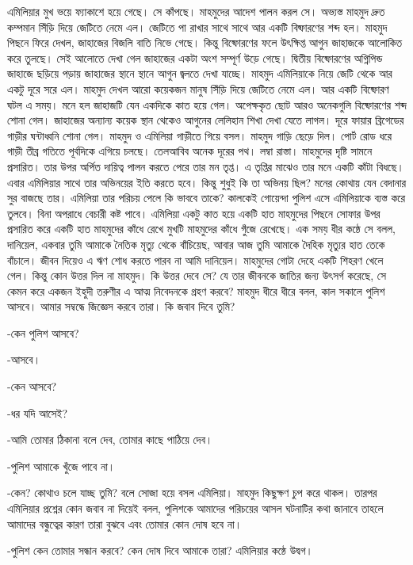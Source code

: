 \documentclass[
]{book}
\begin{document}
এমিলিয়ার মুখ ভয়ে ফ্যাকাশে হয়ে গেছে। সে কাঁপছে। মাহমুদের আদেশ পালন করল সে। অভ্যস্ত মাহমুদ দ্রুত কম্পমান সিঁড়ি দিয়ে জেটিতে নেমে এল। জেটিতে পা রাখার সাথে সাথে আর একটি বিষ্ফারণের শব্দ হল। মাহমুদ পিছনে ফিরে দেখল, জাহাজের বিজলি বাতি নিভে গেছে। কিন্তু বিষ্ফোরণের ফলে উৎক্ষিপ্ত আগুন জাহাজকে আলোকিত করে তুলছে। সেই আলোতে দেখা গেল জাহাজের একটা অংশ সম্পূর্ণ উড়ে গেছে। দ্বিতীয় বিষ্ফোরণের অগ্নিপিন্ড জাহাজে ছড়িয়ে পড়ায় জাহাজের স্থানে স্থানে আগুন জ্বলতে দেখা যাচ্ছে। মাহমুদ এমিলিয়াকে নিয়ে জেটি থেকে আর একটু দূরে সরে এল। মাহমুদ দেখল আরো কয়েকজন মানুষ সিঁড়ি দিয়ে জেটিতে নেমে এল। আর একটি বিষ্ফোরণ ঘটল এ সময়। মনে হল জাহাজটি যেন একদিকে কাত হয়ে গেল। অপেক্ষকৃত ছোট আরও অনেকগুলি বিষ্ফোরণের শব্দ শোনা গেল। জাহাজের অন্যান্য কয়েক স্থান থেকেও আগুনের লেলিহান শিখা দেখা যেতে লাগল। দূরে ফায়ার ব্রিগেডের গাড়ীর ঘন্টাধ্বনি শোনা গেল। মাহমুদ ও এমিলিয়া গাড়ীতে গিয়ে বসল। মাহমুদ গাড়ি ছেড়ে দিল। পোর্ট রোড ধরে গাড়ী তীব্র গতিতে পূর্বদিকে এগিয়ে চলছে। তেলআবিব অনেক দূরের পথ। লম্বা রাস্তা। মাহমুদের দৃষ্টি সামনে প্রসারিত। তার উপর অর্পিত দায়িত্ব পালন করতে পেরে তার মন তৃপ্ত। এ তৃপ্তির মাঝেও তার মনে একটি কাঁটা বিধছে। এবার এমিলিয়ার সাথে তার অভিনয়ের ইতি করতে হবে। কিন্তু শুধুই কি তা অভিনয় ছিল? মনের কোথায় যেন বেদানার সুর বাজছে তার। এমিলিয়া তার পরিচয় পেলে কি ভাববে তাকে? কালকেই গোয়েন্দা পুলিশ এসে এমিলিয়াকে ব্যস্ত করে তুলবে। বিনা অপরাধে বেচারী কষ্ট পাবে। এমিলিয়া একটু কাত হয়ে একটি হাত মাহমুদের পিছনে সোফার উপর প্রসারিত করে একটি হাত মাহমুদের কাঁধে রেখে মুখটি মাহমুদের কাঁধে গুঁজে রেখেছে। এক সময় ধীর কন্ঠে সে বলল, দানিয়েল, একবার তুমি আমাকে নৈতিক মৃত্যু থেকে বাঁচিয়েছ, আবার আজ তুমি আমাকে দৈহিক মৃত্যুর হাত তেকে বাঁচালে। জীবন দিয়েও এ ঋণ শোধ করতে পারব না আমি দানিয়েল। মাহমুদের গোটা দেহে একটি শিহরণ খেলে গেল। কিন্তু কোন উত্তর দিল না মাহমুদ। কি উত্তর দেবে সে? যে তার জীবনকে জাতির জন্য উৎসর্গ করেছে, সে কেমন করে একজন ইহুদী তরুণীর এ আত্ম নিবেদনকে গ্রহণ করবে? মাহমুদ ধীরে ধীরে বলল, কাল সকালে পুলিশ আসবে। আমার সম্বন্ধে জিজ্ঞেস করবে তারা। কি জবাব দিবে তুমি?

-কেন পুলিশ আসবে?

-আসবে।

-কেন আসবে?

-ধর যদি আসেই?

-আমি তোমার ঠিকানা বলে দেব, তোমার কাছে পাঠিয়ে দেব।

-পুলিশ আমাকে খুঁজে পাবে না।

-কেন? কোথাও চলে যাচ্ছ তুমি? বলে সোজা হয়ে বসল এমিলিয়া। মাহমুদ কিছুক্ষণ চুপ করে থাকল। তারপর এমিলিয়ার প্রশ্নের কোন জবাব না দিয়েই বলল, পুলিশকে আমাদের পরিচয়ের আসল ঘটনাটির কথা জানাবে তাহলে আমাদের বন্ধুত্বের কারণ তারা বুঝবে এবং তোমার কোন দোষ হবে না।

-পুলিশ কেন তোমার সন্ধান করবে? কেন দোষ দিবে আমাকে তারা? এমিলিয়ার কন্ঠে উদ্বগ।
\end{document}
